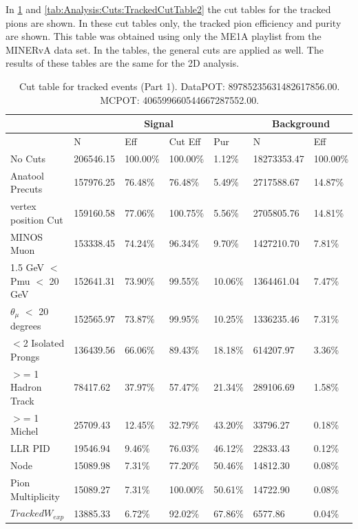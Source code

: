 In \ref{tab:Analysis:Cuts:TrackedCutTable1} and \ref{tab:Analysis:Cuts:TrackedCutTable2} the cut tables for the tracked pions are shown. In these cut tables only, the tracked pion efficiency and purity are shown. This table was obtained using only the ME1A playlist from the MINERvA data set. In the tables, the general cuts are applied as well. The results of these tables are the same for the 2D analysis.  

\begin{table}[!hbt]
    \tiny
    \centering
    \begin{tabular}{|*{7}{l|}}


    \hline
    & \multicolumn{4}{c|}{Signal} & \multicolumn{2}{c|}{Background} \\
    \hline

& N     & Eff     & Cut Eff & Pur    & N         & Eff  \\\hline

 No Cuts    & 206546.15     & 100.00\% & 100.00\% &   1.12\% & 18273353.47 & 100.00\%  \\ \hline
 Anatool Precuts   & 157976.25     &  76.48\% &  76.48\% &   5.49\% & 2717588.67 &  14.87\%   \\ \hline
 vertex position Cut  & 159160.58     &  77.06\% & 100.75\% &   5.56\% & 2705805.76 &  14.81\%  \\ \hline
 MINOS Muon  & 153338.45     &  74.24\% &  96.34\% &   9.70\% & 1427210.70 &   7.81\%  \\ \hline
 1.5 GeV $<$ Pmu $<$ 20 GeV   & 152641.31     &  73.90\% &  99.55\% &  10.06\% & 1364461.04 &   7.47\% \\ \hline
 $\theta_{\mu}$ $<$ 20 degrees   & 152565.97     &  73.87\% &  99.95\% &  10.25\% & 1336235.46 &   7.31\%  \\ \hline
 $<$2 Isolated Prongs   & 136439.56     &  66.06\% &  89.43\% &  18.18\% & 614207.97 &   3.36\%  \\ \hline
 $>$= 1 Hadron Track    & 78417.62     &  37.97\% &  57.47\% &  21.34\% & 289106.69 &   1.58\% \\ \hline
 $>$= 1 Michel   & 25709.43     &  12.45\% &  32.79\% &  43.20\% & 33796.27 &   0.18\% \\ \hline
 LLR PID   & 19546.94     &   9.46\% &  76.03\% &  46.12\% & 22833.43 &   0.12\% \\ \hline
 Node  & 15089.98     &   7.31\% &  77.20\% &  50.46\% & 14812.30 &   0.08\%  \\ \hline
 Pion Multiplicity    & 15089.27     &   7.31\% & 100.00\% &  50.61\% & 14722.90 &   0.08\% \\ \hline
 $Tracked W_{exp}$   & 13885.33     &   6.72\% &  92.02\% &  67.86\% & 6577.86 &   0.04\%  \\ \hline
    \end{tabular}
    \caption{Cut table for tracked events (Part 1). DataPOT: 89785235631482617856.00. MCPOT: 406599660544667287552.00.}
    \label{tab:Analysis:Cuts:TrackedCutTable1}
\end{table}

